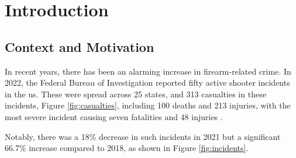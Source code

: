 \chapter{Introduction}
\label{chapter:introduction}

\newenvironment{introduction2}
{\quote\itshape}
{\endquote}

\begin{introduction2}
\end{introduction2}

\section{Context and Motivation}
In recent years, there has been an alarming increase in firearm-related crime. In 2022, the Federal Bureau of 
Investigation reported fifty active shooter incidents in the \ac{us}. These were spread across 25 states, 
and 313 casualties in these incidents, 
Figure \ref{fig:casualties}, including 100 deaths and 213 injuries, with the most severe incident causing seven 
fatalities and 48 injuries \cite{rfc37}.

Notably, there was a 18\% decrease in such incidents in 2021 but a significant 66.7\% increase compared to 2018, as shown in Figure \ref{fig:incidents}.

